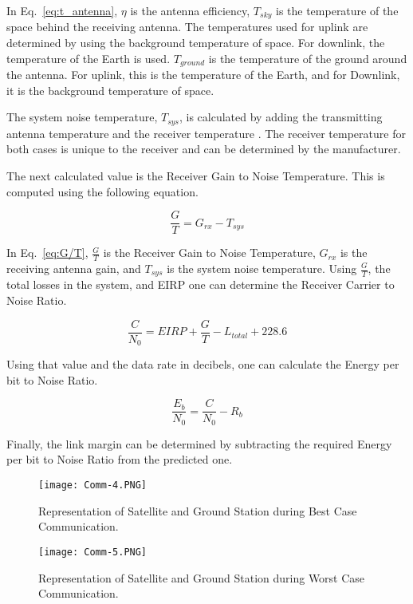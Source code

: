 \documentclass[12pt]{article}
\begin{document}
In Eq.~\ref{eq:t_antenna}, $\eta$ is the antenna efficiency, $T_{sky}$ is the temperature of the space behind the receiving antenna. The temperatures used for uplink are determined by using the background temperature of space. For downlink, the temperature of the Earth is used. $T_{ground}$ is the temperature of the ground around the antenna. For uplink, this is the temperature of the Earth, and for Downlink, it is the background temperature of space.

The system noise temperature, $T_{sys}$, is calculated by adding the transmitting antenna temperature and the receiver temperature \cite{pozar}. The receiver temperature for both cases is unique to the receiver and can be determined by the manufacturer.

The next calculated value is the Receiver Gain to Noise Temperature. This is computed \cite{SMAD} using the following equation.

\begin{equation}\label{eq:G/T}
\frac{G}{T} =  G_{rx} - T_{sys} 
\end{equation}

In Eq.~\ref{eq:G/T}, $\frac{G}{T}$ is the Receiver Gain to Noise Temperature, $G_{rx}$ is the receiving antenna gain, and $T_{sys}$ is the system noise temperature. Using $\frac{G}{T}$, the total losses in the system, and EIRP one can determine \cite{SMAD} the Receiver Carrier to Noise Ratio.

\begin{equation}\label{eq:c/n}
\frac{C}{N_0} = EIRP + \frac{G}{T} - L_{total} + 228.6 
\end{equation}

Using that value and the data rate in decibels, one can calculate \cite{SMAD} the Energy per bit to Noise Ratio.

\begin{equation}\label{eq:eb/n}
\frac{E_b}{N_0} = \frac{C}{N_0} - R_b 
\end{equation}

Finally, the link margin can be determined by subtracting the required Energy per bit to Noise Ratio from the predicted one. 

\begin{figure}[ht]
\centering
  \texttt{[image: Comm-4.PNG]}
\caption{Representation of Satellite and Ground Station during Best Case Communication.}
\label{fig:comm_best}
\end{figure}

\begin{figure}[ht]
\centering
  \texttt{[image: Comm-5.PNG]}
\caption{Representation of Satellite and Ground Station during Worst Case Communication.}
\label{fig:comm_worst}
\end{figure}
\end{document}
